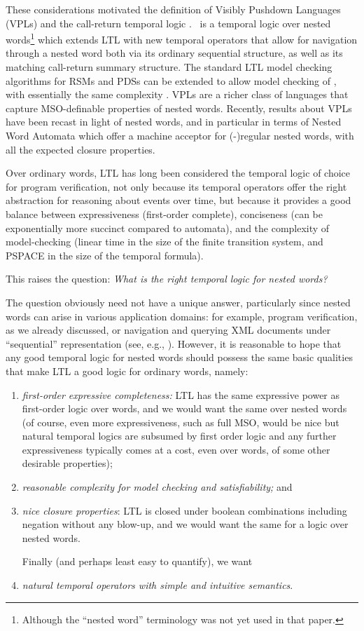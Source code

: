 \documentclass{LMCS}
\theoremstyle{plain}
\theoremstyle{definition}
\newcommand{\caret}{\text{CaRet}}
\newcounter{example}
\begin{document}
These considerations motivated the definition 
of Visibly Pushdown Languages (VPLs) \cite{VPL} and
the call-return temporal logic \caret{} \cite{AEM04}.
\caret\ is a temporal logic over nested words\footnote{Although
the ``nested word'' terminology was not yet used in that paper.}
which extends LTL with new temporal operators that allow for
navigation through a nested word both via its ordinary sequential
structure, as well as its matching 
call-return summary structure.
The standard LTL model checking
algorithms for RSMs and PDSs can be extended to allow model
checking of \caret{}, with essentially the same complexity \cite{AEM04}.
VPLs \cite{VPL} are a richer class of languages
that capture MSO-definable properties of nested
words.  
Recently, results about VPLs have been recast in light
of nested words, and in particular in terms of Nested Word Automata
\cite{nested} which offer a machine acceptor 
for (-)regular nested words, with all the
expected closure properties.

Over ordinary words, LTL has long been considered
the temporal logic of choice 
for program verification, not only
because its temporal operators offer the right abstraction for reasoning
about events over time, but
because it provides a good balance
between expressiveness (first-order complete), 
conciseness (can be exponentially more succinct compared to automata), 
and the complexity of  
model-checking (linear time
in the size of the finite transition system, 
and PSPACE in the size of the temporal formula).

This raises the question: 
{\em What is the right temporal logic 
for nested words?
}

The question obviously need not have a unique answer, particularly
since nested words can arise in various application domains: for
example, 
program verification, as we already discussed, or navigation and querying XML
documents under ``sequential'' representation (see, e.g., \cite{SV02}).
However, it is reasonable to hope that any good temporal logic for
nested words should possess the same basic qualities that make LTL a
good logic for ordinary words, namely: 
\begin{enumerate}[(1)]
\item  {\em first-order
expressive completeness:} LTL has the same expressive power as
first-order logic over words, and we would want the same over nested
words (of course, even more expressiveness, such as full MSO, would
be nice but natural temporal logics are subsumed by first order logic
and any further expressiveness typically comes at a cost, even over
words, of some other desirable properties); 
\item {\em reasonable
complexity for model checking and satisfiability;} and 
\item {\em nice
closure properties}: LTL is closed under boolean combinations
including negation without any blow-up, and we would want the same
for a logic over nested words. 

Finally (and perhaps least easy to
quantify), we want 
\item  {\em natural temporal operators with simple and
intuitive semantics}.  
\end{enumerate}
\end{document}
